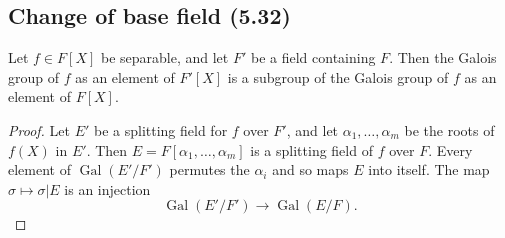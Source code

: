 \subsection*{Change of base field (5.32)}
\begin{lemma}[5.32]
Let $f\in F[X]$ be separable, and let $F'$ be a field containing $F$. Then the Galois group of $f$ as an element of $F'[X]$ is a subgroup of the Galois group of $f$ as an element of $F[X]$.
\end{lemma}
\begin{proof}
Let $E'$ be a splitting field for $f$ over $F'$, and let $\alpha_1,\ldots,\alpha_m$ be the roots of $f(X)$ in $E'$. Then $E=F[\alpha_1,\ldots,\alpha_m]$ is a splitting field of $f$ over $F$. Every element of $\operatorname{Gal}(E'/F')$ permutes the $\alpha_i$ and so maps $E$ into itself. The map $\sigma\mapsto\sigma|E$ is an injection
\[
\operatorname{Gal}(E'/F')\longrightarrow\operatorname{Gal}(E/F).
\]
\end{proof}

